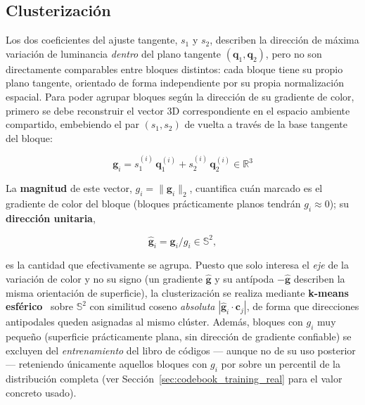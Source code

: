     \subsection{Clusterización}

Los dos coeficientes del ajuste tangente, $s_1$ y $s_2$, describen la dirección de máxima
variación de luminancia \emph{dentro} del plano tangente $(\mathbf{q}_1,\mathbf{q}_2)$, pero no
son directamente comparables entre bloques distintos: cada bloque tiene su propio plano
tangente, orientado de forma independiente por su propia normalización espacial. Para poder
agrupar bloques según la dirección de su gradiente de color, primero se debe reconstruir el
vector 3D correspondiente en el espacio ambiente compartido, embebiendo el par $(s_1,s_2)$ de
vuelta a través de la base tangente del bloque:

\begin{equation}
    \mathbf{g}_i = s_1^{(i)}\, \mathbf{q}_1^{(i)} + s_2^{(i)}\, \mathbf{q}_2^{(i)} \in \mathbb{R}^3
\end{equation}

La \textbf{magnitud} de este vector, $g_i = \|\mathbf{g}_i\|_2$, cuantifica cuán marcado es el
gradiente de color del bloque (bloques prácticamente planos tendrán $g_i \approx 0$); su
\textbf{dirección unitaria},

\begin{equation}
    \hat{\mathbf{g}}_i = \mathbf{g}_i / g_i \in \mathbb{S}^2,
\end{equation}

es la cantidad que efectivamente se agrupa. Puesto que solo interesa el \emph{eje} de la
variación de color y no su signo (un gradiente $\hat{\mathbf{g}}$ y su antípoda $-\hat{\mathbf{g}}$
describen la misma orientación de superficie), la clusterización se realiza mediante
\textbf{k-means esférico}~\cite{dhillon2001concept} sobre $\mathbb{S}^2$ con similitud coseno \emph{absoluta}
$|\hat{\mathbf{g}}_i \cdot \mathbf{c}_j|$, de forma que direcciones antipodales queden asignadas
al mismo clúster. Además, bloques con $g_i$ muy pequeño (superficie prácticamente plana, sin
dirección de gradiente confiable) se excluyen del \emph{entrenamiento} del libro de códigos —
aunque no de su uso posterior — reteniendo únicamente aquellos bloques con $g_i$ por sobre un
percentil de la distribución completa (ver Sección~\ref{sec:codebook_training_real} para el
valor concreto usado).


